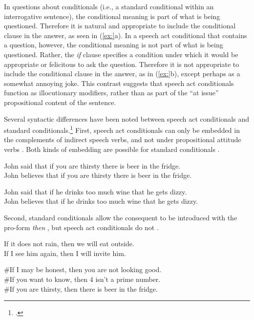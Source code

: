 In questions about conditionals (i.e., a standard conditional within an interrogative sentence), the conditional meaning is part of what is being questioned. Therefore it is natural and appropriate to include the conditional clause in the answer, as seen in (\ref{ex:}a). In a speech act conditional that contains a question, however, the conditional meaning is not part of what is being questioned. Rather, the \textit{if} clause specifies a condition under which it would be appropriate or felicitous to ask the question. Therefore it is not appropriate to include the conditional clause in the answer, as in (\ref{ex:}b), except perhaps as a somewhat annoying joke. This contrast suggests that speech act conditionals function as illocutionary modifiers, rather than as part of the “at issue” propositional content of the sentence.



Several syntactic differences have been noted between speech act conditionals and standard conditionals.\footnote{\citet{BhattPancheva2006}.} First, speech act conditionals can only be embedded in the complements of indirect speech verbs, and not under propositional attitude verbs . Both kinds of embedding are possible for standard conditionals .


\ea
\ea John said that if you are thirsty there is beer in the fridge.\\
\ex *John believes that if you are thirsty there is beer in the fridge.
                       \z
\z

\ea
\ea John said that if he drinks too much wine that he gets dizzy.\\
\ex John believes that if he drinks too much wine that he gets dizzy.
                       \z
\z


Second, standard conditionals allow the consequent to be introduced with the pro-form \textit{then} , but speech act conditionals do not .


\ea
\ea If it does not rain, then we will eat outside.\\
\ex If I see him again, then I will invite him.
                       \z
\z

\ea
\ea \#If I may be honest, then you are not looking good.\\
\ex \#If you want to know, then 4 isn’t a prime number.\\
\ex \#If you are thirsty, then there is beer in the fridge.
                       \z
\z


